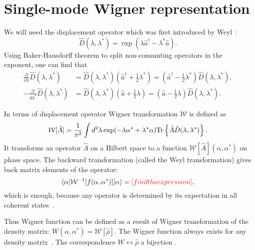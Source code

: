 \section{Single-mode Wigner representation}

We will need the displacement operator which was first introduced by Weyl~\cite{Weyl1950}:
\begin{equation}
\label{eqn:formalism:sm-wigner:dispacement-op}
	\hat{D}(\lambda, \lambda^*) = \exp(\lambda \hat{a}^\dagger - \lambda^* \hat{a}).
\end{equation}
Using Baker-Hausdorff theorem to split non-commuting operators in the exponent,
one can find that
\begin{equation}
\label{eqn:formalism:sm-wigner:displacement-derivatives}
\begin{split}
	\frac{\partial}{\partial \lambda} \hat{D}(\lambda, \lambda^*)
	& = \hat{D}(\lambda, \lambda^*) (\hat{a}^\dagger + \frac{1}{2} \lambda^*)
	= (\hat{a}^\dagger - \frac{1}{2} \lambda^*) \hat{D}(\lambda, \lambda^*), \\
	-\frac{\partial}{\partial \lambda^*} \hat{D}(\lambda, \lambda^*)
	& = \hat{D}(\lambda, \lambda^*) (\hat{a} + \frac{1}{2} \lambda)
	= (\hat{a} - \frac{1}{2} \lambda) \hat{D}(\lambda, \lambda^*).
\end{split}
\end{equation}

In terms of displacement operator Wigner transformation $\mathcal{W}$ is defined as
\begin{equation}
\label{eqn:formalism:sm-wigner:w-transformation}
	\mathcal{W}[\hat{A}]
	= \frac{1}{\pi^2} \int d^2 \lambda \exp(-\lambda \alpha^* + \lambda^* \alpha)
		\mathrm{Tr} \left\{  \hat{A} \hat{D}(\lambda, \lambda^*)  \right\}.
\end{equation}
It transforms an operator $\hat{A}$ on a Hilbert space to a function $\mathcal{W}[\hat{A}](\alpha, \alpha^*)$ on phase space.
The backward transformation (called the Weyl transformation) gives back matrix elements of the operator:
\[
	\langle \alpha \lvert \mathcal{W}^{-1}[f(\alpha, \alpha^*)] \rvert \alpha \rangle
	= \textcolor{red}{[find the expression]},
\]
which is enough, because any operator is determined by its expectation in all coherent states~\cite{Gardiner2004}.

Thus Wigner function can be defined as a result of Wigner transformation of the density matrix: $W(\alpha, \alpha^*) = \mathcal{W}[\hat{\rho}]$.
The Wigner function always exists for any density matrix~\cite{Gardiner2004}.
The correspondence $W \leftrightarrow \hat{\rho}$ a bijection .

